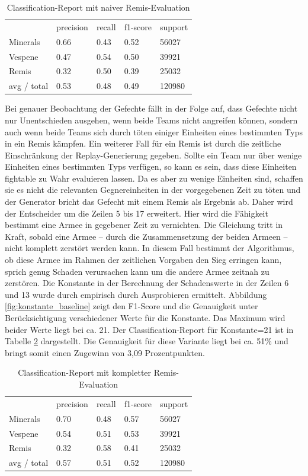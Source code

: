 \begin{table}
\centering
\caption{Classification-Report mit naiver Remis-Evaluation}
\begin{tabular}{@{}lllll@{}}
\hline
& precision & recall & f1-score & support\\
Minerals & 0.66 & 0.43 & 0.52 & 56027\\
Vespene & 0.47 & 0.54 & 0.50 & 39921\\
Remis & 0.32 & 0.50 & 0.39 & 25032\\
 avg / total & 0.53 & 0.48 & 0.49 & 120980\\
\hline
\end{tabular}
\label{tb:classificationmitremisnaiv}
\end{table}

Bei genauer Beobachtung der Gefechte fällt in der Folge auf, dass Gefechte nicht nur Unentschieden ausgehen, wenn beide Teams nicht angreifen können, sondern auch wenn beide Teams sich durch töten einiger Einheiten eines bestimmten Typs in ein Remis kämpfen. Ein weiterer Fall für ein Remis ist durch die zeitliche Einschränkung der Replay-Generierung gegeben. Sollte ein Team nur über wenige Einheiten eines bestimmten Typs verfügen, so kann es sein, dass diese Einheiten fightable zu Wahr evaluieren lassen. Da es aber zu wenige Einheiten sind, schaffen sie es nicht die relevanten Gegnereinheiten in der vorgegebenen Zeit zu töten und der Generator bricht das Gefecht mit einem Remis als Ergebnis ab. Daher wird der Entscheider um die Zeilen 5 bis 17 erweitert. Hier wird die Fähigkeit bestimmt eine Armee in gegebener Zeit zu vernichten. Die Gleichung tritt in Kraft, sobald eine Armee -- durch die Zusammensetzung der beiden Armeen -- nicht komplett zerstört werden kann. In diesem Fall bestimmt der Algorithmus, ob diese Armee im Rahmen der zeitlichen Vorgaben den Sieg erringen kann, sprich genug Schaden verursachen kann um die andere Armee zeitnah zu zerstören. Die Konstante in der Berechnung der Schadenswerte in der Zeilen 6 und 13 wurde durch empirisch durch Ausprobieren ermittelt. Abbildung \ref{fig:konstante_baseline} zeigt den F1-Score und die Genauigkeit unter Berücksichtigung verschiedener Werte für die Konstante. Das Maximum wird beider Werte liegt bei ca. 21. Der Classification-Report für Konstante=21 ist in Tabelle \ref{tb:classificationcomplete} dargestellt. Die Genauigkeit für diese Variante liegt bei ca. 51\% und bringt somit einen Zugewinn von 3,09 Prozentpunkten.

\begin{table}
\centering
\caption{Classification-Report mit kompletter Remis-Evaluation}
\begin{tabular}{@{}lllll@{}}
\hline
& precision & recall & f1-score & support\\
Minerals & 0.70 & 0.48 & 0.57 & 56027\\
Vespene & 0.54 & 0.51 & 0.53 & 39921\\
Remis & 0.32 & 0.58 & 0.41 & 25032\\
 avg / total & 0.57 & 0.51 & 0.52 & 120980\\
\hline
\end{tabular}
\label{tb:classificationcomplete}
\end{table}

